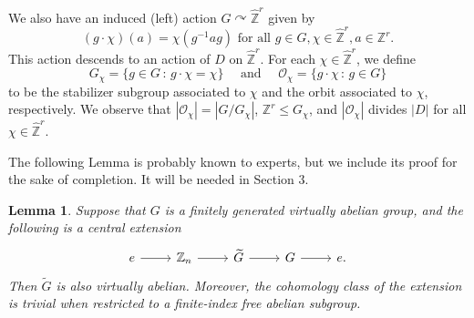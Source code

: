 \documentclass{amsart}
\newtheorem{lemma}[theorem]{Lemma}
\theoremstyle{definition}
\newcommand{\Z}{\mathbb{Z}}
\newcommand{\mc}{\mathcal}
\begin{document}
We also have an induced (left) action $G\curvearrowright\widehat{\Z}^r$ given by 
\[(g\cdot \chi)(a)=\chi(g^{-1}ag)\text{ for all }g\in G, \chi\in\widehat{\Z}^r, a\in \Z^r.\]
This action descends to an action of $D$ on $\widehat{\Z}^r$. For each $\chi\in \widehat{\Z}^r$, we define
\begin{equation}\label{eqn:stabilizer_and_orbit}
G_{\chi}=\{g\in G\,\colon\,g\cdot \chi=\chi\}\quad\text{ and }\quad\mc{O}_{\chi}=\{g\cdot\chi\,\colon\,g\in G\}
\end{equation}
to be the stabilizer subgroup associated to $\chi$ and the orbit associated to $\chi$, respectively. We observe that $|\mc{O}_{\chi}|={|G/ G_{\chi}|}$, $\Z^r\leq G_{\chi}$, and $|\mc{O}_{\chi}|$ divides $|D|$ for all $\chi\in\widehat{\Z}^r$. \par
The following Lemma is probably known to experts, but we include its proof for the sake of completion. It will be needed in Section 3.
\begin{lemma}\label{extVA}
Suppose that $G$ is a finitely generated virtually abelian group, and the following is a central extension
$$\begin{tikzcd}
e\arrow{r}&\Z_n\arrow{r}&\widetilde{G}\arrow{r}&G\arrow{r}&e.
\end{tikzcd}$$
Then $\widetilde{G}$ is also virtually abelian. Moreover, the cohomology class of the extension is trivial when restricted to a finite-index free abelian subgroup.
\end{lemma}
\end{document}
